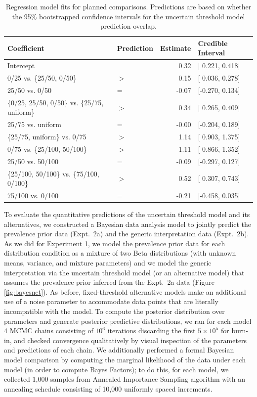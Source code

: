 \documentclass[floatsintext,doc]{apa6}
\begin{document}
\begin{table}[h]
\centering
\begingroup\fontsize{10pt}{11pt}\selectfont
\begin{tabular}{llrl}
  \hline
Coefficient & Prediction & Estimate & Credible Interval \\ 
  \hline
Intercept &  & 0.32 & [ 0.221, 0.418] \\ 
  0/25 vs. \{25/50, 0/50\} & $>$ & 0.15 & [ 0.036, 0.278] \\ 
  25/50 vs. 0/50 & = & -0.07 & [-0.270, 0.134] \\ 
  \{0/25, 25/50, 0/50\} vs. \{25/75, uniform\} & $>$ & 0.34 & [ 0.265, 0.409] \\ 
  25/75 vs. uniform & = & -0.00 & [-0.204, 0.189] \\ 
  \{25/75, uniform\} vs. 0/75 & $>$ & 1.14 & [ 0.903, 1.375] \\ 
  0/75 vs. \{25/100, 50/100\} & $>$ & 1.11 & [ 0.866, 1.352] \\ 
  25/50 vs. 50/100 & = & -0.09 & [-0.297, 0.127] \\ 
  \{25/100, 50/100\} vs. \{75/100, 0/100\} & $>$ & 0.52 & [ 0.307, 0.743] \\ 
  75/100 vs. 0/100 & = & -0.21 & [-0.458, 0.035] \\ 
   \hline
\end{tabular}
\endgroup
\caption{Regression model fits for planned comparisons. Predictions are based on whether the 95\% bootstrapped confidence intervals for the uncertain threshold model prediction overlap.} 
\end{table}

To evaluate the quantitative predictions of the uncertain threshold model and its alternatives, we constructed a Bayesian data analysis model to jointly predict the prevalence prior data (Expt.~2a) and the generic interpretation data (Expt.~2b).
As we did for Experiment 1, we model the prevalence prior data for each distribution condition as a mixture of two Beta distributions (with unknown means, variance, and mixture parameters) and we model the generic interpretation via the uncertain threshold model (or an alternative model) that assumes the prevalence prior inferred from the Expt.~2a data (Figure \ref{fig:bayesnet}).
As before, fixed-threshold alternative models make an additional use of a noise parameter to accommodate data points that are literally incompatible with the model. 
To compute the posterior distribution over parameters and generate posterior predictive distributions, we ran for each model 4 MCMC chains consisting of $10^6$ iterations discarding the first $5 \times 10^5$ for burn-in, and checked convergence qualitatively by visual inspection of the parameters and predictions of each chain. 
We additionally performed a formal Bayesian model comparison by computing the marginal likelihood of the data under each model (in order to compute Bayes Factors); to do this, for each model, we collected 1,000 samples from Annealed Importance Sampling algorithm with an annealing schedule consisting of 10,000 uniformly spaced increments. 
\end{document}
